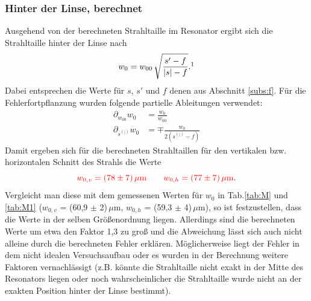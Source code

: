 \subsubsection*{Hinter der Linse, berechnet}
Ausgehend von der berechneten Strahltaille im Resonator ergibt sich die Strahltaille hinter der Linse nach 
\begin{equation*}
    w_0 = w_{00}\,\sqrt{\frac{s'-f}{|s|-f}}. \mathrm{\footnotemark}
\end{equation*}
Dabei entsprechen die Werte für $s$, $s'$ und $f$ denen aus Abschnitt \ref{subs:f}. Für die Fehlerfortpflanzung wurden folgende partielle Ableitungen verwendet: 
\begin{align*}
    \partial_{w_{00}}w_0 &= \frac{w_0}{w_{00}}\\
    \partial_{s^{(|)}}w_{0} &= \mp \frac{w_0}{2(s^{(|)}-f)}
\end{align*}
Damit ergeben sich für die berechneten Strahltaillen für den vertikalen bzw. horizontalen Schnitt des Strahls die Werte 
\begin{equation*}
    \textcolor{red}{w_{0,v} = (78 \pm 7)\,\mu\mathrm{m} \qquad w_{0,h} = (77 \pm 7)\,\mu\mathrm{m}}.
\end{equation*}
Vergleicht man diese mit dem gemessenen Werten für $w_0$ in Tab.\ref{tab:M} und \ref{tab:M1} ($w_{0,v}$ = (60,9  $\pm$ 2)\,$\mu$m, $w_{0,h}$ = (59,3  $\pm$ 4)\,$\mu$m), so ist festzustellen, 
dass die Werte in der selben Größenordnung liegen. Allerdings sind die berechneten Werte um etwa den Faktor 1,3 zu groß und die Abweichung lässt sich auch nicht alleine durch 
die berechneten Fehler erklären. Möglicherweise liegt der Fehler in dem nicht idealen Versuchsaufbau oder es wurden in der Berechnung weitere Faktoren vernachlässigt (z.B. 
könnte die Strahltaille nicht exakt in der Mitte des Resonators liegen oder noch wahrscheinlicher die Strahltaille wurde nicht an der exakten Position hinter der Linse 
bestimmt).

